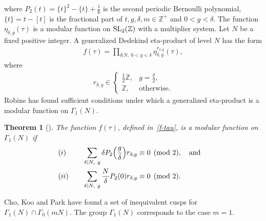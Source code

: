 \documentclass[10pt,a4paper]{amsart}
\numberwithin{equation}{section}
\newtheorem{Theorem}{Theorem}[section]
\theoremstyle{definition}
\begin{document}
where $P_2(t)=\{t\}^2-\{t\}+\frac{1}{6}$ is the second periodic Bernoulli polynomial, $\{t\}=t-[t]$ is the fractional part of $t, g, \delta, m\in\mathbb{Z}^{+}$ and $0 < g < \delta$. The function $\eta_{\delta,g}(\tau)$ is a modular function on ${\rm SL}_2(\mathbb{Z})$ with a multiplier system. Let $N$ be a fixed positive integer. A generalized Dedekind eta-product of level $N$ has the form
\begin{align}\label{f-tau}
f(\tau)=\prod_{\delta|N,~0 < g < \delta}\eta_{\delta,g}^{r_{\delta,g}}(\tau),
\end{align}
where
\begin{align*}%
r_{\delta,g}\in \begin{cases}
			\frac{1}{2}\mathbb{Z},  &g=\frac{\delta}{2},\\
			\mathbb{Z}, &\text{otherwise}.\end{cases}
\end{align*}
Robins \cite{Ro94} has found sufficient conditions under which a generalized eta-product is a modular function on $\Gamma_1(N)$.
\begin{Theorem}[{\cite[Theorem 3]{Ro94}}]\label{Thm-2.1}
The function $f(\tau)$, defined in~\eqref{f-tau}, is a modular function on~$\Gamma_1(N)$ if
\begin{alignat*}{3}
&(i) \quad && \sum_{\delta|N,~g}\delta P_2\Bigl(\frac{g}{\delta}\Bigr)r_{\delta,g} \equiv 0 \pmod 2, \quad \text{and}& \\
&(ii) \quad && \sum_{\delta|N,~g}\frac{N}{\delta}P_2(0)r_{\delta,g} \equiv 0 \pmod 2.&
\end{alignat*}
\end{Theorem}
Cho, Koo and Park \cite{CKP09} have found a set of inequivalent cusps for $\Gamma_1(N)\cap\Gamma_0(mN)$. The group $\Gamma_1(N)$ corresponds to the case $m=1$.
\end{document}

